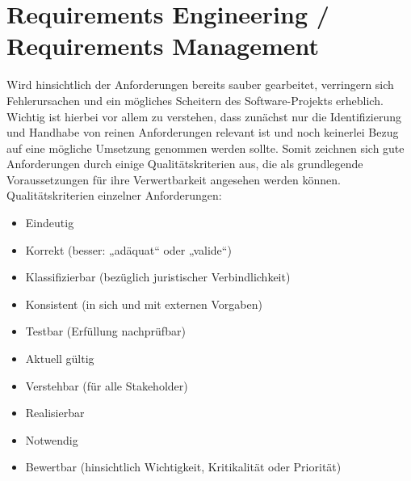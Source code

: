 
\section{Requirements Engineering / Requirements Management}
Wird hinsichtlich der Anforderungen bereits sauber gearbeitet, verringern sich Fehlerursachen und ein mögliches Scheitern des Software-Projekts erheblich. Wichtig ist hierbei vor allem zu verstehen, dass zunächst nur die Identifizierung und Handhabe von reinen Anforderungen relevant ist und noch keinerlei Bezug auf eine mögliche Umsetzung genommen werden sollte. Somit zeichnen sich gute Anforderungen durch einige Qualitätskriterien aus, die als grundlegende Voraussetzungen für ihre Verwertbarkeit angesehen werden können. 
\\
Qualitätskriterien einzelner Anforderungen:
\\
\begin{itemize}
	\item Eindeutig
	\item Korrekt (besser: „adäquat“ oder „valide“)
	\item Klassifizierbar (bezüglich juristischer Verbindlichkeit)
	\item Konsistent (in sich und mit externen Vorgaben)
	\item Testbar (Erfüllung nachprüfbar)
	\item Aktuell gültig
	\item Verstehbar (für alle Stakeholder)
	\item Realisierbar
	\item Notwendig
	\item Bewertbar (hinsichtlich Wichtigkeit, Kritikalität oder Priorität)
\end{itemize}

